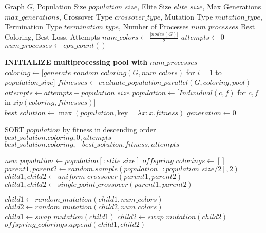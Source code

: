 \documentclass{article}
\begin{document}
\begin{algorithm}
\caption{Parallel Genetic Algorithm for Graph Coloring}
\begin{algorithmic}[1]
\REQUIRE Graph $G$, Population Size $population\_size$, Elite Size $elite\_size$, Max Generations $max\_generations$, Crossover Type $crossover\_type$, Mutation Type $mutation\_type$, Termination Type $termination\_type$, Number of Processes $num\_processes$
\ENSURE Best Coloring, Best Loss, Attempts
\STATE $num\_colors \gets \frac{|nodes(G)|}{2}$
\STATE $attempts \gets 0$
    \STATE $num\_processes \gets cpu\_count()$
\ENDIF

\STATE \textbf{INITIALIZE multiprocessing pool with} $num\_processes$
\STATE $coloring \gets [generate\_random\_coloring(G, num\_colors)$ for $i = 1$ to $population\_size]$
\STATE $fitnesses \gets evaluate\_population\_parallel(G, coloring, pool)$
\STATE $attempts \gets attempts + population\_size$
\STATE $population \gets [Individual(c, f)$ for $c, f$ in $zip(coloring, fitnesses)]$
\STATE $best\_solution \gets \max(population, \text{key} = \lambda x: x.fitness)$
\STATE $generation \gets 0$

    \STATE SORT $population$ by fitness in descending order
        \STATE \RETURN $best\_solution.coloring, 0, attempts$
    \ENDIF
        \STATE \RETURN $best\_solution.coloring, -best\_solution.fitness, attempts$
    \ENDIF

    \STATE $new\_population \gets population[:elite\_size]$
    \STATE $offspring\_colorings \gets []$
        \STATE $parent1, parent2 \gets random.sample(population[:population\_size / 2], 2)$
            \STATE $child1, child2 \gets uniform\_crossover(parent1, parent2)$
        \ELSE
            \STATE $child1, child2 \gets single\_point\_crossover(parent1, parent2)$
        \ENDIF

            \STATE $child1 \gets random\_mutation(child1, num\_colors)$
            \STATE $child2 \gets random\_mutation(child2, num\_colors)$
        \ELSE
            \STATE $child1 \gets swap\_mutation(child1)$
            \STATE $child2 \gets swap\_mutation(child2)$
        \ENDIF
        \STATE $offspring\_colorings.append(child1, child2)$
    \ENDWHILE


\end{algorithmic}
\end{algorithm}
\end{document}
